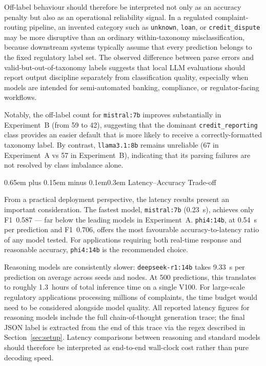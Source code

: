 \documentclass[10pt,a4paper,twocolumn]{article}
\makeatletter
\renewcommand\subsection{\@startsection{subsection}{2}{0pt}%
  {0.65em plus 0.15em minus 0.1em}{0.3em}%
  {\normalfont\normalsize\itshape}}
\makeatother
\begin{document}
Off-label behaviour should therefore be interpreted not only as an
accuracy penalty but also as an operational reliability signal. In a
regulated complaint-routing pipeline, an invented category such as
\texttt{unknown}, \texttt{loan}, or \texttt{credit\_dispute} may be
more disruptive than an ordinary within-taxonomy misclassification,
because downstream systems typically assume that every prediction
belongs to the fixed regulatory label set. The observed difference
between parse errors and valid-but-out-of-taxonomy labels suggests
that local LLM evaluations should report output discipline separately
from classification quality, especially when models are intended for
semi-automated banking, compliance, or regulator-facing workflows.

Notably, the off-label count for \texttt{mistral:7b} improves
substantially in Experiment~B (from 59 to 42), suggesting that the
dominant \texttt{credit\_reporting} class provides an easier default
that is more likely to receive a correctly-formatted taxonomy label.
By contrast, \texttt{llama3.1:8b} remains unreliable
(67 in Experiment~A vs 57 in Experiment~B), indicating that its
parsing failures are not resolved by class imbalance alone.

\subsection{Latency--Accuracy Trade-off}

From a practical deployment perspective, the latency results present
an important consideration. The fastest model, \texttt{mistral:7b}
(0.23~s), achieves only F1~0.587 --- far below the leading models in
Experiment~A.
\texttt{phi4:14b}, at 0.54~s per prediction and F1~0.706, offers
the most favourable accuracy-to-latency ratio of any model tested.
For applications requiring both real-time response and reasonable
accuracy, \texttt{phi4:14b} is the recommended choice.

Reasoning models are consistently slower: \texttt{deepseek-r1:14b}
takes 9.33~s per prediction on average across seeds and nodes.
At 500 predictions, this translates to roughly 1.3~hours of total
inference time on a single V100. For
large-scale regulatory applications processing millions of complaints,
the time budget would need to be considered alongside model quality.
All reported latency figures for reasoning models include the full
chain-of-thought generation trace; the final JSON label is extracted
from the end of this trace via the regex described in
Section~\ref{sec:setup}. Latency comparisons between reasoning and
standard models should therefore be interpreted as end-to-end
wall-clock cost rather than pure decoding speed.
\end{document}
